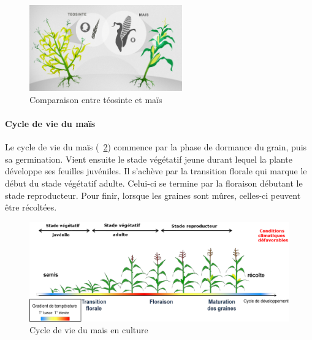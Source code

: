 \documentclass[12pt,a4paper]{article}
\begin{document}
				\begin{figure}[h]
					\centering
					\includegraphics[width=6.6cm]{comparaison.jpg}
					\caption{Comparaison entre téosinte et maïs}
					\label{Comparaison entre téosinte et maïs}
				\end{figure}
				
				\paragraph{Cycle de vie du maïs}
				Le cycle de vie du maïs (~\ref{Cycle de vie du maïs en culture}) commence par la phase de dormance du grain, puis sa germination. Vient ensuite le stade végétatif jeune durant lequel la plante développe ses feuilles juvéniles. Il s'achève par la transition florale qui marque le début du stade végétatif adulte. Celui-ci se termine par la floraison débutant le stade reproducteur. Pour finir, lorsque les graines sont mûres, celles-ci peuvent être récoltées.
				\begin{figure}[h]
					\centering
					\includegraphics[width=13.7cm]{cycle.png}
					\caption{Cycle de vie du maïs en culture}
					\label{Cycle de vie du maïs en culture}
				\end{figure}
					
			
\end{document}
